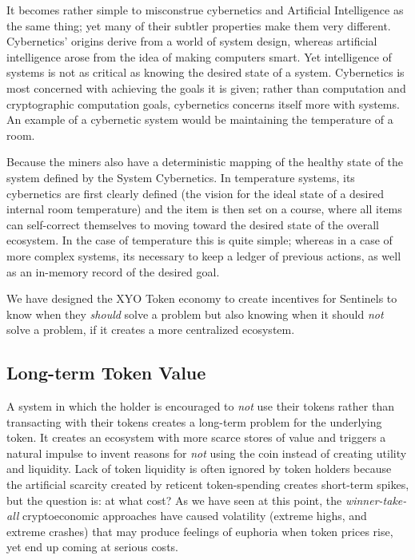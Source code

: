 \documentclass{article}
\begin{document}
It becomes rather simple to misconstrue cybernetics and Artificial Intelligence as the same thing; yet many of their subtler properties make them very different. Cybernetics' origins derive from a world of system design, whereas artificial intelligence arose from the idea of making computers smart. Yet intelligence of systems is not as critical as knowing the desired state of a system. Cybernetics is most concerned with achieving the goals it is given; rather than computation and cryptographic computation goals, cybernetics concerns itself more with systems. An example of a cybernetic system would be maintaining the temperature of a room. 

Because the miners also have a deterministic mapping of the healthy state of the system defined by the System Cybernetics. In temperature systems, its cybernetics are first clearly defined (the vision for the ideal state of a desired internal room temperature) and the item is then set on a course, where all items can self-correct themselves to moving toward the desired state of the overall ecosystem. In the case of temperature this is quite simple; whereas in a case of more complex systems, its necessary to keep a ledger of previous actions, as well as an in-memory record of the desired goal. 

We have designed the XYO Token economy to create incentives for Sentinels to know when they \textit{should} solve a problem but also knowing when it should \textit{not} solve a problem, if it creates a more centralized ecosystem. 

\subsection{Long-term Token Value}
A system in which the holder is encouraged to \textit{not} use their tokens rather than transacting with their tokens creates a long-term problem for the underlying token.  It creates an ecosystem with more scarce stores of value and triggers a natural impulse to invent reasons for \textit{not} using the coin instead of creating utility and liquidity. Lack of token liquidity is often ignored by token holders because the artificial scarcity created by reticent token-spending creates short-term spikes, but the question is: at what cost? As we have seen at this point, the \textit{winner-take-all} cryptoeconomic approaches have caused volatility (extreme highs, and extreme crashes) that may produce feelings of euphoria when token prices rise, yet end up coming at serious costs. 
\end{document}
